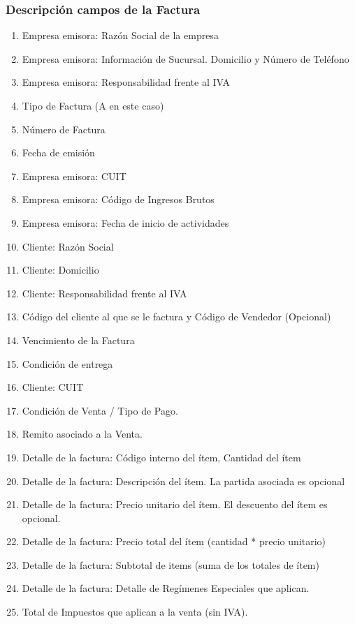 \subsubsection{Descripci\'on campos de la Factura}
\begin{enumerate}
  \item Empresa emisora: Raz\'on Social de la empresa
  \item Empresa emisora: Información de Sucursal. Domicilio y N\'umero de Tel\'efono
  \item Empresa emisora: Responsabilidad frente al IVA
  \item Tipo de Factura (A en este caso)
  \item N\'umero de Factura
  \item Fecha de emisi\'on
  \item Empresa emisora: CUIT
  \item Empresa emisora: C\'odigo de Ingresos Brutos
  \item Empresa emisora: Fecha de inicio de actividades
  \item Cliente: Raz\'on Social 
  \item Cliente: Domicilio
  \item Cliente: Responsabilidad frente al IVA
  \item C\'odigo del cliente al que se le factura y C\'odigo de Vendedor (Opcional)
  \item Vencimiento de la Factura
  \item Condici\'on de entrega
  \item Cliente: CUIT
  \item Condici\'on de Venta / Tipo de Pago.
  \item Remito asociado a la Venta.
  \item Detalle de la factura: C\'odigo interno del \'item, Cantidad del \'item
  \item Detalle de la factura: Descripci\'on del \'item. La partida asociada es opcional
  \item Detalle de la factura: Precio unitario del \'item. El descuento del \'item es opcional.
  \item Detalle de la factura: Precio total del \'item (cantidad * precio unitario)
  \item Detalle de la factura: Subtotal de items (suma de los totales de \'item)
  \item Detalle de la factura: Detalle de Regímenes Especiales que aplican.
  \item Total de Impuestos que aplican a la venta (sin IVA).

\end{enumerate}
